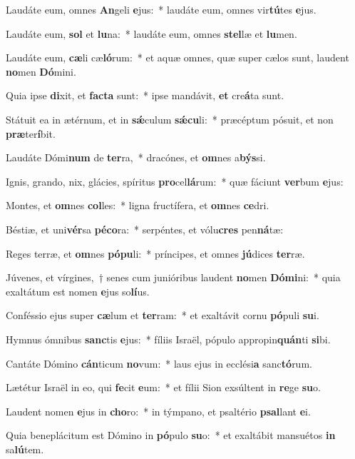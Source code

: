 \item Laudáte eum, omnes \textbf{An}geli \textbf{e}jus:~* laudáte eum, omnes vir\textbf{tú}tes \textbf{e}jus.
\item Laudáte eum, \textbf{sol} et \textbf{lu}na:~* laudáte eum, omnes \textbf{stel}læ et \textbf{lu}men.
\item Laudáte eum, \textbf{cæ}li cæ\textbf{ló}rum:~* et aquæ omnes, quæ super cælos sunt, laudent \textbf{no}men \textbf{Dó}mini.
\item Quia ipse \textbf{di}xit, et \textbf{fac}\textbf{ta} sunt:~* ipse mandávit, \textbf{et} cre\textbf{á}ta sunt.
\item Státuit ea in ætérnum, et in \textbf{sǽ}culum \textbf{sǽ}\textbf{cu}li:~* præcéptum pósuit, et non \textbf{præ}ter\textbf{í}bit.
\item Laudáte Dómi\textbf{num} de \textbf{ter}ra,~* dracónes, et \textbf{om}nes a\textbf{býs}si.
\item Ignis, grando, nix, glácies, spíritus \textbf{pro}cel\textbf{lá}rum:~* quæ fáciunt \textbf{ver}bum \textbf{e}jus:
\item Montes, et \textbf{om}nes \textbf{col}les:~* ligna fructífera, et \textbf{om}nes \textbf{ce}dri.
\item Béstiæ, et uni\textbf{vér}sa \textbf{pé}\textbf{co}ra:~* serpéntes, et vólu\textbf{cres} pen\textbf{ná}tæ:
\item Reges terræ, et \textbf{om}nes \textbf{pó}\textbf{pu}li:~* príncipes, et omnes \textbf{jú}dices \textbf{ter}ræ.
\item Júvenes, et vírgines,~† senes cum junióribus laudent \textbf{no}men \textbf{Dó}\textbf{mi}ni:~* quia exaltátum est nomen \textbf{e}jus so\textbf{lí}us.
\item Conféssio ejus super \textbf{cæ}lum et \textbf{ter}ram:~* et exaltávit cornu \textbf{pó}puli \textbf{su}i.
\item Hymnus ómnibus \textbf{sanc}tis \textbf{e}jus:~* fíliis Israël, pópulo appropin\textbf{quán}ti \textbf{si}bi.
\item Cantáte Dómino \textbf{cán}ticum \textbf{no}vum:~* laus ejus in ecclési\textbf{a} sanc\textbf{tó}rum.
\item Lætétur Israël in eo, qui \textbf{fe}cit \textbf{e}um:~* et fílii Sion exsúltent in \textbf{re}ge \textbf{su}o.
\item Laudent nomen \textbf{e}jus in \textbf{cho}ro:~* in týmpano, et psaltério \textbf{psal}lant \textbf{e}i.
\item Quia beneplácitum est Dómino in \textbf{pó}pulo \textbf{su}o:~* et exaltábit mansuétos \textbf{in} sa\textbf{lú}tem.
